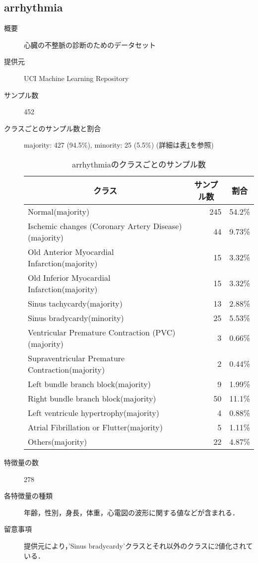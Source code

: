 \subsection{arrhythmia}
\begin{description}
    \item[概要] 心臓の不整脈の診断のためのデータセット\cite{arrhythmia}
    \item[提供元] UCI Machine Learning Repository
    \item[サンプル数] 452
    \item[クラスごとのサンプル数と割合] majority: 427 (94.5\%), minority: 25 (5.5\%) (詳細は表\ref{tab:arrhythmia}を参照)
    \begin{table}[htbp]
        \centering
        \caption{arrhythmiaのクラスごとのサンプル数}
        \label{tab:arrhythmia}
        \begin{tabular}{lrc} \hline
            \multicolumn{1}{c}{クラス}&
            \multicolumn{1}{c}{サンプル数}&
            \multicolumn{1}{c}{割合}\\
            \hline
            \hline
            Normal(majority) & 245 & 54.2\% \\
            Ischemic changes (Coronary Artery Disease)(majority) & 44 & 9.73\% \\
            Old Anterior Myocardial Infarction(majority) & 15 & 3.32\% \\
            Old Inferior Myocardial Infarction(majority) & 15 & 3.32\% \\
            Sinus tachycardy(majority) & 13 & 2.88\% \\
            Sinus bradycardy(minority) & 25 & 5.53\% \\
            Ventricular Premature Contraction (PVC)(majority) & 3 & 0.66\% \\
            Supraventricular Premature Contraction(majority) & 2 & 0.44\% \\
            Left bundle branch block(majority) & 9 & 1.99\% \\
            Right bundle branch block(majority) & 50 & 11.1\% \\
            Left ventricule hypertrophy(majority) & 4 & 0.88\% \\
            Atrial Fibrillation or Flutter(majority) & 5 & 1.11\% \\
            Others(majority) & 22 & 4.87\% \\
            \hline
        \end{tabular}
    \end{table}
    \item[特徴量の数] 278
    \item[各特徴量の種類] 年齢，性別，身長，体重，心電図の波形に関する値などが含まれる．
        
    \item[留意事項] 提供元により，'Sinus bradycardy'クラスとそれ以外のクラスに2値化されている．
\end{description}

